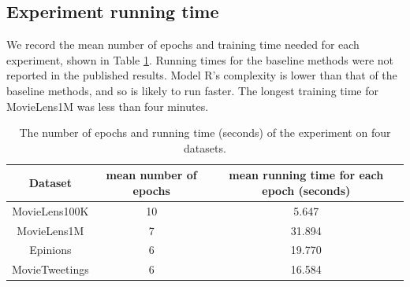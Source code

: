 \documentclass[12pt]{WSUThesis}
\theoremstyle{definition}
\begin{document}
\subsection{Experiment running time}
We record the mean number of epochs and training time needed for each experiment, shown in Table \ref{tab:time-recommendation}.
Running times for the baseline methods were not reported in the published results. Model R's complexity is lower than that of the baseline methods, and so is likely to run faster. The longest training time for MovieLens1M was less than four minutes.
\begin{table}[!htb]
	\centering
	\caption{
		The number of epochs and running time (seconds) of the experiment on four datasets.
	}
	\begin{tabular}{ccc} \hline \rowcolor{blue!30}
		Dataset & mean number of epochs & mean running time for each epoch (seconds) \\ \hline
		MovieLens100K & 10 & 5.647 \\ \hline
		MovieLens1M & 7 & 31.894 \\ \hline
		Epinions & 6 & 19.770 \\ \hline
		MovieTweetings & 6 & 16.584 \\ \hline
	\end{tabular}
	\label{tab:time-recommendation}
\end{table}
\end{document}
